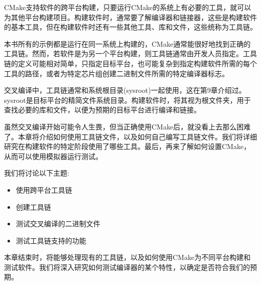 CMake支持软件的跨平台构建，只要运行CMake的系统上有必要的工具，就可以为其他平台构建项目。构建软件时，通常要了解编译器和链接器，这些是构建软件的基本工具，但在构建软件时还有一些其他工具、库和文件，这些统称为工具链。

本书所有的示例都是运行在同一系统上构建的，CMake通常能很好地找到正确的工具链。然而，若软件是为另一个平台构建，则工具链通常由开发人员指定。工具链的定义可能相对简单，只指定目标平台，也可能复杂到指定构建软件所需的每个工具的路径，或者为特定芯片组创建二进制文件所需的特定编译器标志。

交叉编译中，工具链通常和系统根目录(sysroot)一起使用，这在第9章介绍过。sysroot是目标平台的精简文件系统目录。构建软件时，将其视为根文件夹，用于查找必要的库和文件，以便为预期的目标平台进行编译和链接。

虽然交叉编译开始可能令人生畏，但当正确使用CMake后，就没看上去那么困难了。本章将介绍如何使用工具链文件，以及如何自己编写工具链文件。我们将详细研究在构建软件的特定阶段使用了哪些工具。最后，再来了解如何设置CMake，从而可以使用模拟器运行测试。

我们将讨论以下主题:

\begin{itemize}
\item 
使用跨平台工具链

\item 
创建工具链

\item 
测试交叉编译的二进制文件

\item 
测试工具链支持的功能
\end{itemize}

本章结束时，将能够处理现有的工具链，以及如何使用CMake为不同平台构建和测试软件。我们将深入研究如何测试编译器的某个特性，以确定是否符合我们的预期。
















